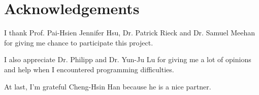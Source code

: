 \documentclass[class=NTHU_thesis, crop=false]{standalone}
\begin{document}
\chapter{Acknowledgements}
I thank Prof. Pai-Hsien Jennifer Hsu, Dr. Patrick Rieck and Dr. Samuel Meehan for giving me chance to participate this project.

I also appreciate Dr. Philipp and Dr. Yun-Ju Lu for giving me a lot of opinions and help when I encountered programming difficulties.

At last, I'm grateful Cheng-Hsin Han because he is a nice partner.
\end{document}
